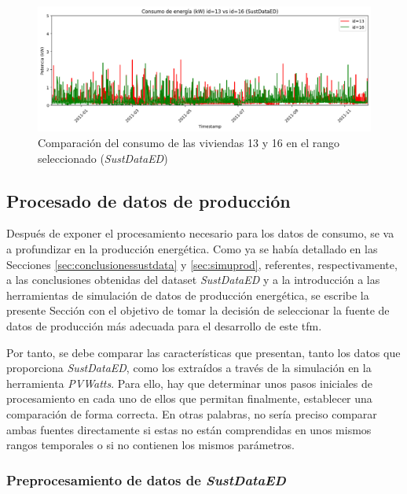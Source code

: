 \vspace{3mm}

\begin{figure}[H]
  \centering
  \includegraphics[width=1\textwidth]{img/diseno/1316.png}
  \caption{Comparación del consumo de las viviendas 13 y 16 en el rango seleccionado (\textit{SustDataED})}
  \label{fig:1316}
\end{figure}

\subsection{Procesado de datos de producción}
\label{sec:procprod}

Después de exponer el procesamiento necesario para los datos de consumo, se va a profundizar en la producción energética. Como ya se había detallado en las Secciones \ref{sec:conclusionessustdata} y \ref{sec:simuprod},  referentes, respectivamente, a las conclusiones obtenidas del dataset \textit{SustDataED} y a la introducción a las herramientas de simulación de datos de producción energética, se escribe la presente Sección con el objetivo de tomar la decisión de seleccionar la fuente de datos de producción más adecuada para el desarrollo de este \gls{tfm}.

\vspace{3mm}

Por tanto, se debe comparar las características que presentan, tanto los datos que proporciona \textit{SustDataED}, como los extraídos a través de la simulación en la herramienta \textit{PVWatts}. Para ello, hay que determinar unos pasos iniciales de procesamiento en cada uno de ellos que permitan finalmente, establecer una comparación de forma correcta. En otras palabras, no sería preciso comparar ambas fuentes directamente si estas no están comprendidas en unos mismos rangos temporales o si no contienen los mismos parámetros. 

\subsubsection{Preprocesamiento de datos de \textit{SustDataED}}
\label{sec:preprocsust}

